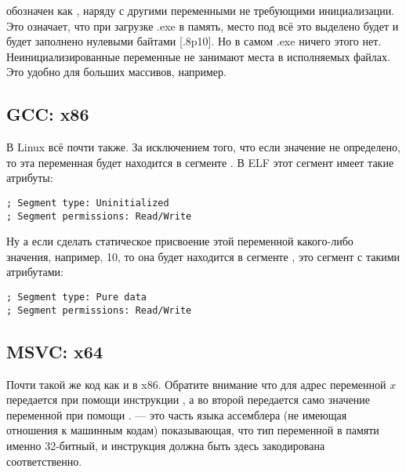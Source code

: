  обозначен как , наряду с другими переменными не требующими инициализации. 
Это означает, что при загрузке .exe в память, место под всё это выделено будет и будет заполнено
нулевыми байтами [.8p10]. 
Но в самом .exe ничего этого нет. Неинициализированные переменные не занимают места в исполняемых файлах. 
Это удобно для больших массивов, например.



\subsection{GCC: x86}

В Linux всё почти также. За исключением того, что если значение  не определено, 
то эта переменная будет находится в сегменте .
В \ac{ELF} этот сегмент имеет такие атрибуты:

\begin{lstlisting}
; Segment type: Uninitialized
; Segment permissions: Read/Write
\end{lstlisting}

Ну а если сделать статическое присвоение этой переменной какого-либо
значения, например, 10, то она будет находится 
в сегменте ,
это сегмент с такими атрибутами:

\begin{lstlisting}
; Segment type: Pure data
; Segment permissions: Read/Write
\end{lstlisting}

\subsection{MSVC: x64}



Почти такой же код как и в x86.
Обратите внимание что для  адрес переменной $x$ передается
при помощи инструкции \LEA, а во второй \printf передается само значение переменной при помощи \MOV.
 --- это часть языка ассемблера (не имеющая отношения к машинным кодам) показывающая, что тип переменной в памяти именно 32-битный, 
и инструкция \MOV должна быть здесь закодирована соответственно.

